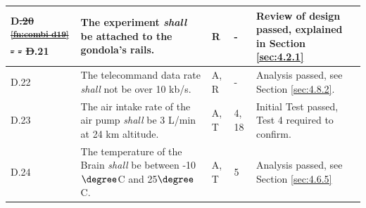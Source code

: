 \documentclass[a4paper,12pt,twoside]{article}
\providecommand{\DIFdeltex}[1]{{\protect\color{red}\sout{#1}}}                      %
\providecommand{\DIFdelbegin}{} %
\providecommand{\DIFdelend}{} %
\providecommand{\DIFdel}[1]{\texorpdfstring{\DIFdeltex{#1}}{}} %
\newcommand{\DIFscaledelfig}{0.5}
\newlength{\DIFdelgraphicswidth} %
\newlength{\DIFdelgraphicsheight} %
\newcommand{\DIFdelincludegraphics}[2][]{%
\sbox{\DIFdelgraphicsbox}{\DIFOincludegraphics[#1]{#2}}%
\settoboxwidth{\DIFdelgraphicswidth}{\DIFdelgraphicsbox} %
\settoboxtotalheight{\DIFdelgraphicsheight}{\DIFdelgraphicsbox} %
\scalebox{\DIFscaledelfig}{%
\parbox[b]{\DIFdelgraphicswidth}{\usebox{\DIFdelgraphicsbox}\\[-\baselineskip] \rule{\DIFdelgraphicswidth}{0em}}\llap{\resizebox{\DIFdelgraphicswidth}{\DIFdelgraphicsheight}{%
\setlength{\unitlength}{\DIFdelgraphicswidth}%
\begin{picture}(1,1)%
\thicklines\linethickness{2pt} %
{\color[rgb]{1,0,0}\put(0,0){\framebox(1,1){}}}%
{\color[rgb]{1,0,0}\put(0,0){\line( 1,1){1}}}%
{\color[rgb]{1,0,0}\put(0,1){\line(1,-1){1}}}%
\end{picture}%
}\hspace*{3pt}}} %
} %
\DeclareRobustCommand{\DIFdelbegin}{\DIFOdelbegin \let\includegraphics\DIFdelincludegraphics} %
\DeclareRobustCommand{\DIFdelend}{\DIFOaddend \let\includegraphics\DIFOincludegraphics} %
\begin{document}
\begin{longtable}[]{|m{}| m{} |m{} |m{}|m{}|}
\\ \hline
D\DIFdelbegin \DIFdel{.20 }%
\DIFdel{\textsuperscript{\ref{fn:combi-d19}}                                                                               }%
\DIFdel{-        }%
\DIFdel{-            }%
\DIFdel{D}\DIFdelend .21 & The experiment \textit{shall} be attached to the gondola’s rails.                                                                                &     R         & -            &  Review of design passed, explained in Section \ref{sec:4.2.1}     
\\ \hline
D.22 & The telecommand data rate \textit{shall} not be over 10 kb/s.                                                                               &     A, R         & -            &    Analysis passed, see Section \ref{sec:4.8.2}.   
\\  \hline

D.23 & The air intake rate of the air pump \textit{shall} be 3 L/min at 24 km altitude.                                                                                                                        &       A, T        & 4, 18            &  Initial Test passed, Test 4 required to confirm.      \\ \hline

D.24 & The temperature of the Brain \textit{shall} be between -10$\degree$C and 25$\degree$C.                                                                                                 &       A, T       & 5           & Analysis passed, see Section \ref{sec:4.6.5}       \\    \hline
\DIFdelbegin %


\end{longtable}
\end{document}
